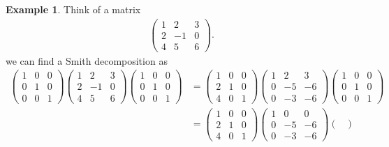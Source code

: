 \documentclass[12pt]{report}
\theoremstyle{plain}
\theoremstyle{remark}
\theoremstyle{definition}
\newtheorem{example}[theorem]{Example}
\begin{document}
\begin{example}
    Think of a matrix
    \begin{align*}
        \begin{pmatrix}
            1 & 2 & 3 \\ 2 & -1 & 0 \\ 4 & 5 & 6
        \end{pmatrix}.
    \end{align*}
    we can find a Smith decomposition as
    \begin{align*}
        \begin{pmatrix}
            1 & 0 & 0 \\ 0 & 1 & 0 \\ 0 & 0 & 1
        \end{pmatrix} \begin{pmatrix}
            1 & 2 & 3 \\ 2 & -1 & 0 \\ 4 & 5 & 6
        \end{pmatrix} \begin{pmatrix}
            1 & 0 & 0 \\ 0 & 1 & 0 \\ 0 & 0 & 1
        \end{pmatrix} &= \begin{pmatrix}
            1 & 0 & 0 \\ 2 & 1 & 0 \\ 4 & 0 & 1
        \end{pmatrix} \begin{pmatrix}
            1 & 2 & 3 \\ 0 & -5 & -6 \\ 0 & -3 & -6
        \end{pmatrix} \begin{pmatrix}
            1 & 0 & 0 \\ 0 & 1 & 0 \\ 0 & 0 & 1
        \end{pmatrix} \\
        &= \begin{pmatrix}
            1 & 0 & 0 \\ 2 & 1 & 0 \\ 4 & 0 & 1
        \end{pmatrix} \begin{pmatrix}
            1 & 0 & 0 \\ 0 & -5 & -6 \\ 0 & -3 & -6
        \end{pmatrix} \begin{pmatrix}

\end{pmatrix}
\end{align*}
\end{example}
\end{document}
